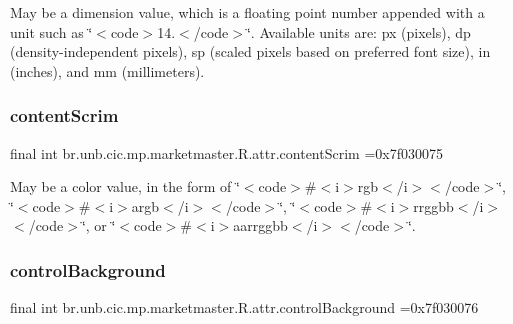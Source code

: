 May be a dimension value, which is a floating point number appended with a unit such as \char`\"{}$<$code$>$14.\+5sp$<$/code$>$\char`\"{}. Available units are\+: px (pixels), dp (density-\/independent pixels), sp (scaled pixels based on preferred font size), in (inches), and mm (millimeters). \mbox{\label{classbr_1_1unb_1_1cic_1_1mp_1_1marketmaster_1_1R_1_1attr_aca7588e2022e131e4fc06d05f02816e2}} 
\subsubsection{\texorpdfstring{content\+Scrim}{contentScrim}}
{\footnotesize\ttfamily final int br.\+unb.\+cic.\+mp.\+marketmaster.\+R.\+attr.\+content\+Scrim =0x7f030075\hspace{0.3cm}{\ttfamily [static]}}

May be a color value, in the form of \char`\"{}$<$code$>$\#$<$i$>$rgb$<$/i$>$$<$/code$>$\char`\"{}, \char`\"{}$<$code$>$\#$<$i$>$argb$<$/i$>$$<$/code$>$\char`\"{}, \char`\"{}$<$code$>$\#$<$i$>$rrggbb$<$/i$>$$<$/code$>$\char`\"{}, or \char`\"{}$<$code$>$\#$<$i$>$aarrggbb$<$/i$>$$<$/code$>$\char`\"{}. \mbox{\label{classbr_1_1unb_1_1cic_1_1mp_1_1marketmaster_1_1R_1_1attr_ae8243f3859b19a9b2459b5305f8740e9}} 
\subsubsection{\texorpdfstring{control\+Background}{controlBackground}}
{\footnotesize\ttfamily final int br.\+unb.\+cic.\+mp.\+marketmaster.\+R.\+attr.\+control\+Background =0x7f030076\hspace{0.3cm}{\ttfamily [static]}}

